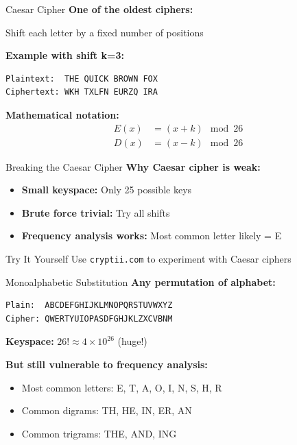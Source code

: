 \documentclass{beamer}
\begin{document}
\begin{frame}[fragile]{Caesar Cipher}
\textbf{One of the oldest ciphers:}

Shift each letter by a fixed number of positions

\vspace{0.3cm}
\textbf{Example with shift k=3:}
\begin{verbatim}
Plaintext:  THE QUICK BROWN FOX
Ciphertext: WKH TXLFN EURZQ IRA
\end{verbatim}

\vspace{0.3cm}
\textbf{Mathematical notation:}
\begin{align*}
E(x) &= (x + k) \mod 26 \\
D(x) &= (x - k) \mod 26
\end{align*}

\end{frame}

\begin{frame}{Breaking the Caesar Cipher}
\textbf{Why Caesar cipher is weak:}

\begin{itemize}
    \item \textbf{Small keyspace:} Only 25 possible keys
    \item \textbf{Brute force trivial:} Try all shifts
    \item \textbf{Frequency analysis works:} Most common letter likely = E
\end{itemize}

\vspace{0.5cm}
\begin{exampleblock}{Try It Yourself}
Use \texttt{cryptii.com} to experiment with Caesar ciphers
\end{exampleblock}

\end{frame}

\begin{frame}[fragile]{Monoalphabetic Substitution}
\textbf{Any permutation of alphabet:}

\begin{verbatim}
Plain:  ABCDEFGHIJKLMNOPQRSTUVWXYZ
Cipher: QWERTYUIOPASDFGHJKLZXCVBNM
\end{verbatim}

\textbf{Keyspace:} $26! \approx 4 \times 10^{26}$ (huge!)

\vspace{0.5cm}
\textbf{But still vulnerable to frequency analysis:}
\begin{itemize}
    \item Most common letters: E, T, A, O, I, N, S, H, R
    \item Common digrams: TH, HE, IN, ER, AN
    \item Common trigrams: THE, AND, ING
\end{itemize}

\end{frame}
\end{document}

